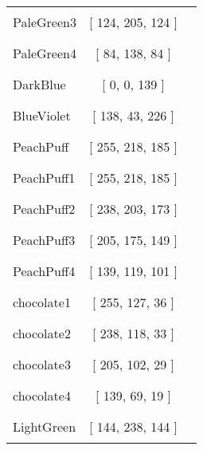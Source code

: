 \begin{tabular}{|l|c|c|}
PaleGreen3 & [ 124, 205, 124 ] & \color{PaleGreen3} \rule{1cm}{1.5ex}\\
PaleGreen4 & [ 84, 138, 84 ] & \color{PaleGreen4} \rule{1cm}{1.5ex}\\
DarkBlue & [ 0, 0, 139 ] & \color{DarkBlue} \rule{1cm}{1.5ex}\\
BlueViolet & [ 138, 43, 226 ] & \color{BlueViolet} \rule{1cm}{1.5ex}\\
PeachPuff & [ 255, 218, 185 ] & \color{PeachPuff} \rule{1cm}{1.5ex}\\
PeachPuff1 & [ 255, 218, 185 ] & \color{PeachPuff1} \rule{1cm}{1.5ex}\\
PeachPuff2 & [ 238, 203, 173 ] & \color{PeachPuff2} \rule{1cm}{1.5ex}\\
PeachPuff3 & [ 205, 175, 149 ] & \color{PeachPuff3} \rule{1cm}{1.5ex}\\
PeachPuff4 & [ 139, 119, 101 ] & \color{PeachPuff4} \rule{1cm}{1.5ex}\\
chocolate1 & [ 255, 127, 36 ] & \color{chocolate1} \rule{1cm}{1.5ex}\\
chocolate2 & [ 238, 118, 33 ] & \color{chocolate2} \rule{1cm}{1.5ex}\\
chocolate3 & [ 205, 102, 29 ] & \color{chocolate3} \rule{1cm}{1.5ex}\\
chocolate4 & [ 139, 69, 19 ] & \color{chocolate4} \rule{1cm}{1.5ex}\\
LightGreen & [ 144, 238, 144 ] & \color{LightGreen} \rule{1cm}{1.5ex}\\
\end{tabular}


